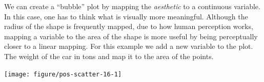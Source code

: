 \documentclass[krantz2]{krantz}\usepackage{knitr}%
\begin{document}
\begin{knitrout}\footnotesize
{}\color{fgcolor}\begin{kframe}
\begin{alltt}
\hlstd{(}  \hlstd{(} \hlstd{=}    \hlopt{+}
  \hlstd{(} \hlstd{=} \hlstd{(} \hlstd{=} \hlstd{))}
\end{alltt}
\end{kframe}
\end{knitrout}

We can create a ``bubble'' plot by mapping the  \emph{aesthetic} to a continuous variable. In this case, one has to think what is visually more meaningful. Although the radius of the shape is frequently mapped, due to how human perception works, mapping a variable to the area of the shape is more useful by being perceptually closer to a linear mapping. For this example we add a new variable to the plot. The weight of the car in tons and map it to the area of the points.

\begin{knitrout}\footnotesize
{}\color{fgcolor}\begin{kframe}
\begin{alltt}
\hlstd{(}  \hlstd{(}   
                           \hlstd{=} 
                            \hlopt{+}
  \hlstd{()} \hlopt{+}
  \hlstd{()}
\end{alltt}
\end{kframe}

{\centering \texttt{[image: figure/pos-scatter-16-1]} 

}



\end{knitrout}
\end{document}

